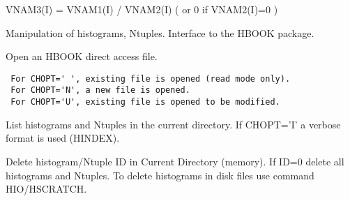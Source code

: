 \BEGARG
{}
\ENDARG
\BEGTEXT
VNAM3(I) = VNAM1(I) / VNAM2(I)     ( or 0 if VNAM2(I)=0 )
\ENDTEXT


\BEGTEXT
Manipulation of histograms, Ntuples.
Interface to the HBOOK package.
\ENDTEXT

\BEGARG
{}
\ENDARG
\BEGTEXT
Open an HBOOK direct access file.
\begin{verbatim}
 For CHOPT=' ', existing file is opened (read mode only).
 For CHOPT='N', a new file is opened.
 For CHOPT='U', existing file is opened to be modified.
\end{verbatim}
\ENDTEXT

\BEGARG
{}
\ENDARG
\BEGTEXT
List histograms and Ntuples in the current directory.
If CHOPT='I' a verbose format is used (HINDEX).
\ENDTEXT

\BEGARG
{}
\ENDARG
\BEGTEXT
Delete histogram/Ntuple ID in Current Directory (memory).
If ID=0 delete all histograms and Ntuples.
To delete histograms in disk files use command HIO/HSCRATCH.
\ENDTEXT

